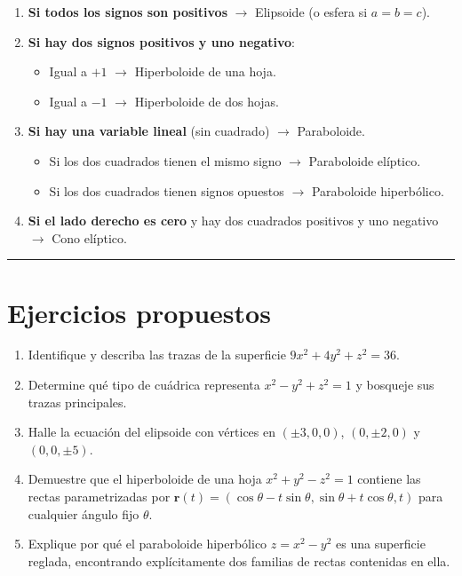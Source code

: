 \documentclass[
]{book}
\providecommand{\tightlist}{%
  \setlength{\itemsep}{0pt}\setlength{\parskip}{0pt}}
\begin{document}
\begin{enumerate}
\def\labelenumi{\arabic{enumi}.}
\tightlist
\item
  \textbf{Si todos los signos son positivos} \(\rightarrow\) Elipsoide (o esfera si \(a = b = c\)).
\item
  \textbf{Si hay dos signos positivos y uno negativo}:

  \begin{itemize}
  \tightlist
  \item
    Igual a \(+1\) \(\rightarrow\) Hiperboloide de una hoja.
  \item
    Igual a \(-1\) \(\rightarrow\) Hiperboloide de dos hojas.
  \end{itemize}
\item
  \textbf{Si hay una variable lineal} (sin cuadrado) \(\rightarrow\) Paraboloide.

  \begin{itemize}
  \tightlist
  \item
    Si los dos cuadrados tienen el mismo signo \(\rightarrow\) Paraboloide elíptico.
  \item
    Si los dos cuadrados tienen signos opuestos \(\rightarrow\) Paraboloide hiperbólico.
  \end{itemize}
\item
  \textbf{Si el lado derecho es cero} y hay dos cuadrados positivos y uno negativo \(\rightarrow\) Cono elíptico.
\end{enumerate}

\begin{center}\rule{0.5\linewidth}{0.5pt}\end{center}

\section{Ejercicios propuestos}\label{ejercicios-propuestos-5}

\begin{enumerate}
\def\labelenumi{\arabic{enumi}.}
\tightlist
\item
  Identifique y describa las trazas de la superficie \(9x^2 + 4y^2 + z^2 = 36\).
\item
  Determine qué tipo de cuádrica representa \(x^2 - y^2 + z^2 = 1\) y bosqueje sus trazas principales.
\item
  Halle la ecuación del elipsoide con vértices en \((\pm 3, 0, 0)\), \((0, \pm 2, 0)\) y \((0, 0, \pm 5)\).
\item
  Demuestre que el hiperboloide de una hoja \(x^2 + y^2 - z^2 = 1\) contiene las rectas parametrizadas por \(\mathbf{r}(t) = (\cos\theta - t\sin\theta, \sin\theta + t\cos\theta, t)\) para cualquier ángulo fijo \(\theta\).
\item
  Explique por qué el paraboloide hiperbólico \(z = x^2 - y^2\) es una superficie reglada, encontrando explícitamente dos familias de rectas contenidas en ella.
\end{enumerate}
\end{document}
